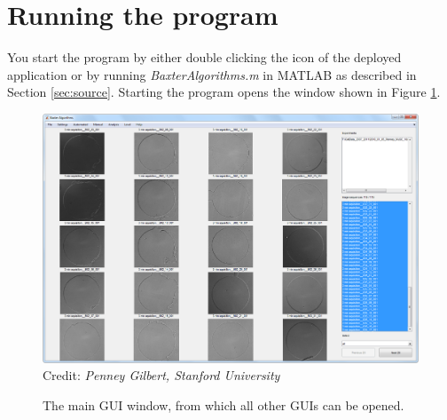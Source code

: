 \documentclass[a4paper, oneside, onecolumn, 11pt]{article}
\newcommand{\file}[1]{\emph{#1}}
\newcommand{\credit}[1]{\raggedleft \scriptsize Credit:\emph{ #1}}
\begin{document}
\section{Running the program}
You start the program by either double clicking the icon of the deployed application or by running \file{BaxterAlgorithms.m} in MATLAB as described in Section \ref{sec:source}. Starting the program opens the window shown in Figure \ref{fig:main-GUI}.

\begin{figure}[!ht]
\begin{center}
\includegraphics[width = \columnwidth]{figures/mainGUI}
\credit{Penney Gilbert, Stanford University}
\caption{The main GUI window, from which all other GUIs can be opened.}
\label{fig:main-GUI}
\end{center}
\end{figure}
\end{document}
